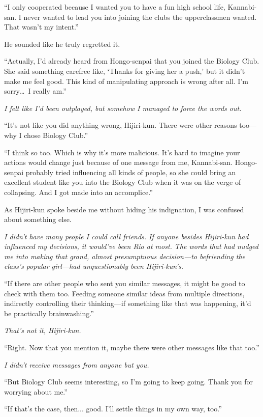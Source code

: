 \documentclass[
    a4paper,
    12pt,
    twoside,
    openany,
    UTF8,
    fontset=windows
]{ctexbook}
\begin{document}
``I only cooperated because I wanted you to have a fun high school life, Kannabi-san. I never wanted to lead you into joining the clubs the upperclassmen wanted. That wasn't my intent.''

He sounded like he truly regretted it.

``Actually, I'd already heard from Hongo-senpai that you joined the Biology Club. She said something carefree like, `Thanks for giving her a push,' but it didn't make me feel good. This kind of manipulating approach is wrong after all. I'm sorry\dots\ I really am.''

\textit{I felt like I'd been outplayed, but somehow I managed to force the words out.}

``It's not like you did anything wrong, Hijiri-kun. There were other reasons too---why I chose Biology Club.''

``I think so too. Which is why it's more malicious. It's hard to imagine your actions would change just because of one message from me, Kannabi-san. Hongo-senpai probably tried influencing all kinds of people, so she could bring an excellent student like you into the Biology Club when it was on the verge of collapsing. And I got made into an accomplice.''

As Hijiri-kun spoke beside me without hiding his indignation, I was confused about something else.

\textit{I didn't have many people I could call friends. If anyone besides Hijiri-kun had influenced my decisions, it would've been Rio at most. The words that had nudged me into making that grand, almost presumptuous decision---to befriending the class's popular girl---had unquestionably been Hijiri-kun's.}

``If there are other people who sent you similar messages, it might be good to check with them too. Feeding someone similar ideas from multiple directions, indirectly controlling their thinking---if something like that was happening, it'd be practically brainwashing.''

\textit{That's not it, Hijiri-kun.}

``Right. Now that you mention it, maybe there were other messages like that too.''

\textit{I didn't receive messages from anyone but you.}

``But Biology Club seems interesting, so I'm going to keep going. Thank you for worrying about me.''

``If that's the case, then... good. I'll settle things in my own way, too.''
\end{document}
